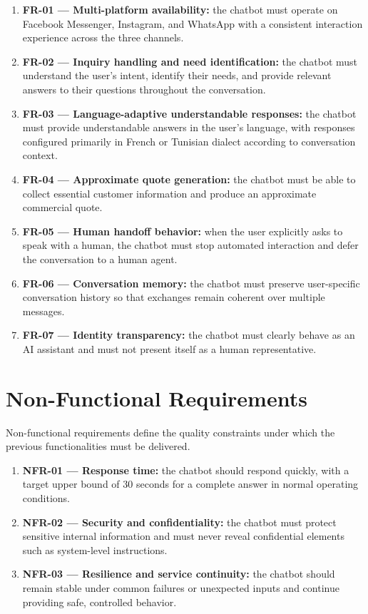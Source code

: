 \begin{enumerate}
    \item \textbf{FR-01 --- Multi-platform availability:} the chatbot must operate on Facebook Messenger, Instagram, and WhatsApp with a consistent interaction experience across the three channels.
    \item \textbf{FR-02 --- Inquiry handling and need identification:} the chatbot must understand the user's intent, identify their needs, and provide relevant answers to their questions throughout the conversation.
    \item \textbf{FR-03 --- Language-adaptive understandable responses:} the chatbot must provide understandable answers in the user's language, with responses configured primarily in French or Tunisian dialect according to conversation context.
    \item \textbf{FR-04 --- Approximate quote generation:} the chatbot must be able to collect essential customer information and produce an approximate commercial quote.
    \item \textbf{FR-05 --- Human handoff behavior:} when the user explicitly asks to speak with a human, the chatbot must stop automated interaction and defer the conversation to a human agent.
    \item \textbf{FR-06 --- Conversation memory:} the chatbot must preserve user-specific conversation history so that exchanges remain coherent over multiple messages.
    \item \textbf{FR-07 --- Identity transparency:} the chatbot must clearly behave as an AI assistant and must not present itself as a human representative.
\end{enumerate}

\section{Non-Functional Requirements}
Non-functional requirements define the quality constraints under which the previous functionalities must be delivered.

\begin{enumerate}
    \item \textbf{NFR-01 --- Response time:} the chatbot should respond quickly, with a target upper bound of 30 seconds for a complete answer in normal operating conditions.
    \item \textbf{NFR-02 --- Security and confidentiality:} the chatbot must protect sensitive internal information and must never reveal confidential elements such as system-level instructions.
    \item \textbf{NFR-03 --- Resilience and service continuity:} the chatbot should remain stable under common failures or unexpected inputs and continue providing safe, controlled behavior.
\end{enumerate}

